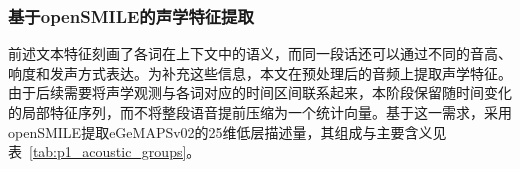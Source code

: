 

\subsubsection{基于openSMILE的声学特征提取}

前述文本特征刻画了各词在上下文中的语义，而同一段话还可以通过不同的音高、响度和发声方式表达。为补充这些信息，本文在预处理后的音频上提取声学特征。由于后续需要将声学观测与各词对应的时间区间联系起来，本阶段保留随时间变化的局部特征序列，而不将整段语音提前压缩为一个统计向量。基于这一需求，采用openSMILE提取eGeMAPSv02的25维低层描述量，其组成与主要含义见表~\ref{tab:p1_acoustic_groups}。

